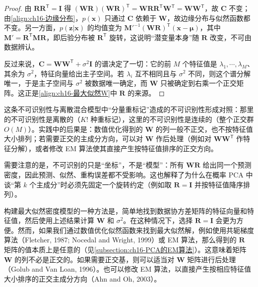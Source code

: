 \documentclass[../../main.tex]{subfiles}
\begin{document}
\begin{proof}
由 $\bm{R}\bm{R}^{\mathsf T}=\bm{I}$ 得 $(\bm{W}\bm{R})(\bm{W}\bm{R})^{\mathsf T}=\bm{W}\bm{R}\bm{R}^{\mathsf T}\bm{W}^{\mathsf T}=\bm{W}\bm{W}^{\mathsf T}$，故 $\bm{C}$ 不变；由\eqref{align:ch16-边缘分布}，$p(\bm{x})$ 只通过 $\bm{C}$ 依赖于 $\bm{W}$，故边缘分布与似然函数都不变。另一方面，$p(\bm{z}|\bm{x})$ 的均值变为 $\bm{M}'^{-1}(\bm{W}\bm{R})^{\mathsf T}(\bm{x}-\bm{\mu})$，其中 $\bm{M}'=\bm{R}^{\mathsf T}\bm{M}\bm{R}$，即后验分布被 $\bm{R}^{\mathsf T}$ 旋转，这说明“潜变量本身”随 $\bm{R}$ 改变，不可由数据辨认。

反过来说，$\bm{C}=\bm{W}\bm{W}^{\mathsf T}+\sigma^2\bm{I}$ 的谱决定了一切：它的前 $M$ 个特征值是 $\lambda_1,\cdots,\lambda_M$、其余为 $\sigma^2$，特征向量给出主子空间。若 $\lambda_i$ 互不相同且与 $\sigma^2$ 不同，则这个谱分解唯一，于是主子空间与 $\sigma^2$ 被数据唯一确定，而 $\bm{W}$ 只被确定到右乘一个正交矩阵。这正是\eqref{align:ch16-最大似然W}中 $\bm{R}$ 的来源。
\end{proof}

\begin{remark}
这条不可识别性与离散混合模型中“分量重标记”造成的不可识别性形成对照：那里的不可识别性是离散的（$K!$ 种重标记），这里的不可识别性是连续的（整个正交群 $O(M)$）。实践中的后果是：数值优化得到的 $\bm{W}$ 的列一般不正交，也不按特征值大小排列；若需要正交的主成分方向，可以对 $\bm{W}$ 作后处理（例如对 $\bm{W}\bm{W}^{\mathsf T}$ 作特征分解），或者修改 EM 算法使其直接产生按特征值排序的正交方向。

需要注意的是，不可识别的只是“坐标”，不是“模型”：所有 $\bm{W}\bm{R}$ 给出同一个预测密度，因此预测、似然、重构误差都不受影响。这也解释了为什么在概率 PCA 中谈“第 $k$ 个主成分”时必须先固定一个旋转约定（例如取 $\bm{R}=\bm{I}$ 并按特征值降序排列）。
\end{remark}

构建最大似然密度模型的一种方法是，简单地找到数据协方差矩阵的特征向量和特征值，然后使用上述结果计算 $\bm{W}$ 和 $\sigma^2$。在这种情况下，选择 $\bm{R}=\bm{I}$ 会更为方便。然而，如果我们通过数值优化似然函数来找到最大似然解，例如使用共轭梯度算法（Fletcher, 1987; Nocedal and Wright, 1999）或 EM 算法，那么得到的 $\bm{R}$ 矩阵的值本质上是任意的（见\cref{subsection:ch16-PCA的EM算法}）。这意味着矩阵 $\bm{W}$ 的列不必是正交的。如果需要正交基，则可以适当对 $\bm{W}$ 矩阵进行后处理（Golub and Van Loan, 1996）。也可以修改 EM 算法，以直接产生按相应特征值大小排序的正交主成分方向（Ahn and Oh, 2003）。
\end{document}
